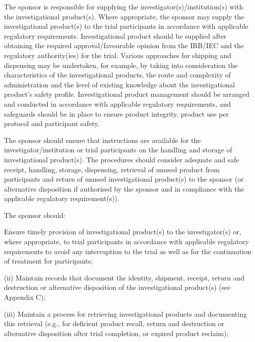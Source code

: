 \documentclass[11pt]{article}
\begin{document}
\begin{description}[leftmargin=2.5cm,style=sameline]

\item[(a)] The sponsor is responsible for supplying the investigator(s)/institution(s) with the investigational product(s). Where appropriate, the sponsor may supply the investigational product(s) to the trial participants in accordance with applicable regulatory requirements. Investigational product should be supplied after obtaining the required approval/favourable opinion from the IRB/IEC and the regulatory authority(ies) for the trial. Various approaches for shipping and dispensing may be undertaken, for example, by taking into consideration the characteristics of the investigational products, the route and complexity of administration and the level of existing knowledge about the investigational product's safety profile. Investigational product management should be arranged and conducted in accordance with applicable regulatory requirements, and safeguards should be in place to ensure product integrity, product use per protocol and participant safety.

\item[(b)] The sponsor should ensure that instructions are available for the investigator/institution or trial participants on the handling and storage of investigational product(s). The procedures should consider adequate and safe receipt, handling, storage, dispensing, retrieval of unused product from participants and return of unused investigational product(s) to the sponsor (or alternative disposition if authorised by the sponsor and in compliance with the applicable regulatory requirement(s)).

\item[(c)] The sponsor should:

\item[(i)] Ensure timely provision of investigational product(s) to the investigator(s) or, where appropriate, to trial participants in accordance with applicable regulatory requirements to avoid any interruption to the trial as well as for the continuation of treatment for participants;

\end{description}

(ii) Maintain records that document the identity, shipment, receipt, return and destruction or alternative disposition of the investigational product(s) (see Appendix C);


(iii) Maintain a process for retrieving investigational products and documenting this retrieval (e.g., for deficient product recall, return and destruction or alternative disposition after trial completion, or expired product reclaim);
\end{document}
